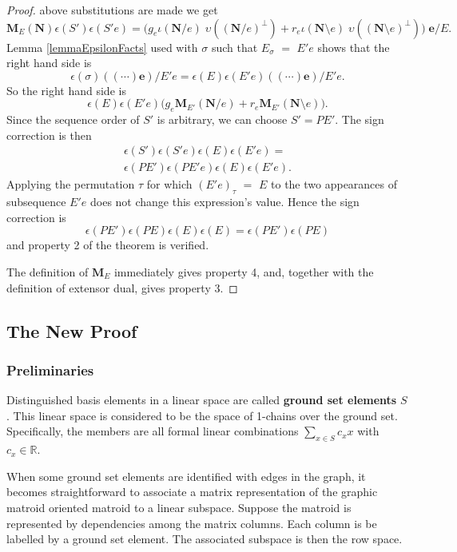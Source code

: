 \documentclass[12pt]{article}
\theoremstyle{definition}
\newcommand{\Is}{\ensuremath{\iota}}
\newcommand{\Vs}{\ensuremath{\upsilon}}
\newcommand{\Reals}{\ensuremath{\mathbb{R}}}
\newcommand{\ext}[1]{\ensuremath{\mathbf{#1}}}
\begin{document}
\begin{proof}
above substitutions are made we get
\[
\ext{M}_E(\ext{N})\epsilon(S')\epsilon(S'e) =
\big(g_e \Is(\ext{N}/e)\;\Vs((\ext{N}/e)^\perp)+
r_e\Is(\ext{N}\setminus e)\;\Vs((\ext{N}\setminus e)^\perp)\big)\;\ext{e}/E.
\]
Lemma \ref{lemmaEpsilonFacts} used with $\sigma$ such that
$E_\sigma$ $=$ $E'e$ shows that the right hand side is
\[
\epsilon(\sigma)((\cdots)\ext{e})/E'e = 
\epsilon(E)\epsilon(E'e)((\cdots)\ext{e})/E'e.
\]
So the right hand side is
\[
\epsilon(E)\epsilon(E'e)\big(g_e\ext{M}_{E'}(\ext{N}/e)+r_e\ext{M}_{E'}(\ext{N}\setminus e)\big).
\]
Since the sequence order of $S'$ is arbitrary, we can choose $S'=PE'$.  The sign correction is then
\begin{equation*}
\begin{split}
\epsilon(S')\epsilon(S'e)\epsilon(E)\epsilon(E'e)=\\
\epsilon(PE')\epsilon(PE'e)\epsilon(E)\epsilon(E'e).
\end{split}
\end{equation*}
Applying the permutation $\tau$ for which $(E'e)_\tau$ $=$ $E$ to the two
appearances of subsequence $E'e$ does not change this expression's value. 
Hence the sign correction is
\[
\epsilon(PE')\epsilon(PE)\epsilon(E)\epsilon(E)=\epsilon(PE')\epsilon(PE)
\]
and property 2 of the theorem is verified.

The definition of $\ext{M}_E$ immediately gives property 4, and, together
with the definition of extensor dual, gives property 3.
\end{proof}


\subsection{The New Proof}
\subsubsection{Preliminaries}

Distinguished basis elements in a linear space are called 
{\bf ground set elements} $S$ .  This linear space
is considered to be the space of 1-chains over the ground set.
Specifically, the members are all formal linear combinations
$\sum_{x\in S}c_xx$ with $c_x\in \Reals$.

When some ground set elements
are identified with edges in the graph, it becomes straightforward
to associate a matrix representation of the graphic matroid
oriented matroid to a linear subspace.  Suppose the matroid
is represented by dependencies among the matrix columns.
Each column is be labelled by a ground set element.
The associated subspace is then the row space.
\end{document}
